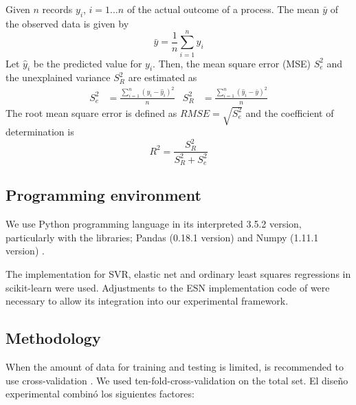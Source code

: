 Given $n$ records $y_i$, $i=1\ldots{}n$ of the actual outcome of a
process. The mean $\bar{y}$ of the observed data is given by
\begin{equation*}
  \bar{y} = \frac{1}{n} \sum_{i=1}^{n} y_i
\end{equation*}
Let $\hat{y}_i$ be the predicted value for $y_i$. Then, the mean
square error (MSE) $S_e^2$ and the unexplained variance $S_R^2$ 
are estimated as \citet{Pennstate2017}
\begin{align*}
S_e^2 &= \frac{\sum_{i=1}^{n} {(y_i-\hat{y}_i)}^2 }{n} &
S_R^2 &= \frac{\sum_{i=1}^{n} {(\hat{y}_i-\bar{y})}^2 }{n}
\end{align*}
The root mean square error is defined as $RMSE = \sqrt{S_e^2}$ and the
coefficient of determination is
\begin{equation*}
R^2 = \frac{S_R^2}{S_R^2 + S_e^2}
\end{equation*}
 
\subsection{Programming environment}

We use Python programming language in its interpreted 3.5.2 version,
 particularly with the libraries; Pandas (0.18.1 version)
\citep{mckinneypandas2010} and Numpy (1.11.1 version) \citep{vanderWalt2011}.

The implementation for SVR, elastic net and ordinary least squares
regressions in scikit-learn \citep{scikitlearn2011} were used.
%
Adjustments to the ESN implementation code of \citet{Lukose2012} were
necessary to allow its integration into our experimental
framework.

\subsection{Methodology}
When the amount of data for training and testing is limited, is recommended
to use cross-validation \citep{Witten2011}. We used ten-fold-cross-validation 
on the total set. El diseño experimental combinó los siguientes factores:

